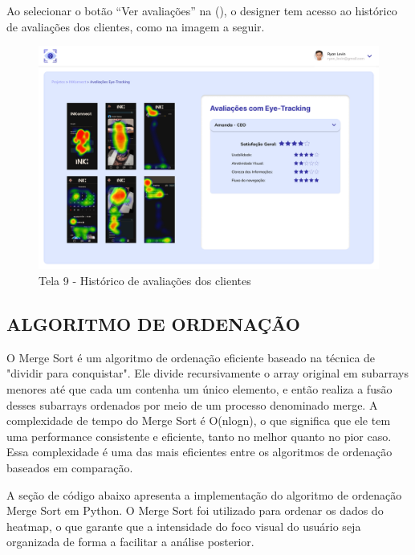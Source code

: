 Ao selecionar o botão “Ver avaliações” na (), o designer tem acesso ao histórico de avaliações dos clientes, como na imagem a seguir.

\begin{figure}[H]
    \centering
    \caption{Tela 9 - Histórico de avaliações dos clientes}%
    \label{fig:pg-tela9}
    \includegraphics[width=0.72\linewidth]{Illustrations/tela9.png}
\end{figure}


\subsection*{ALGORITMO DE ORDENAÇÃO}
O Merge Sort é um algoritmo de ordenação eficiente baseado na técnica de "dividir para conquistar". Ele divide recursivamente o array original em subarrays menores até que cada um contenha um único elemento, e então realiza a fusão desses subarrays ordenados por meio de um processo denominado merge. A complexidade de tempo do Merge Sort é 
O(nlogn), o que significa que ele tem uma performance consistente e eficiente, tanto no melhor quanto no pior caso. Essa complexidade é uma das mais eficientes entre os algoritmos de ordenação baseados em comparação.

A seção de código abaixo apresenta a implementação do algoritmo de ordenação Merge Sort em Python. O Merge Sort foi utilizado para ordenar os dados do heatmap, o que garante que a intensidade do foco visual do usuário seja organizada de forma a facilitar a análise posterior.

